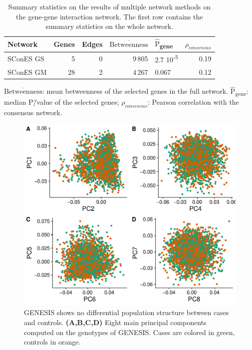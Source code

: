\documentclass[draft,twocolumn, 11pt]{article}
\newcommand{\mean}[1]{$\overline{\mbox{#1}}$}
\newcommand{\median}[1]{$\hat{\mbox{#1}}$}
\begin{document}
\begin{table}[htbp]
\begin{threeparttable}
  \caption{Summary statistics on the results of multiple network methods on the gene-gene interaction network. The first row contains the summary statistics on the whole network.}
\label{tab:scones_gene_solutions}
\centering
\begin{tabular}{lrrrlr}
Network & Genes & Edges & \mean{Betweenness} & \median{P}\textsubscript{gene} & $\rho_{consensus}$\\
\hline
SConES GS & 5 & 0 & 9\,805 & 2.7 \texttimes{} 10\textsuperscript{-5} & 0.19\\
SConES GM & 28 & 2 & 4\,267 & 0.067 & 0.12\\
\end{tabular}
\begin{tablenotes}
  \footnotesize{
    \item \mean{Betweenness}: mean betweenness of the selected genes in the full network. \median{P}\textsubscript{gene}: median P\=/value of the selected genes; $\rho_{consensus}$: Pearson correlation with the consensus network.
  }
\end{tablenotes}
\end{threeparttable}
\end{table}

\begin{figure}[htbp]
\centering
\includegraphics[width=.9\linewidth]{./figures/sfigure_1.pdf}
\caption{GENESIS shows no differential population structure between cases and controls. \textbf{(A,B,C,D)} Eight main principal components computed on the genotypes of GENESIS. Cases are colored in green, controls in orange.}
\label{sfig:pcs}
\end{figure}
\end{document}
